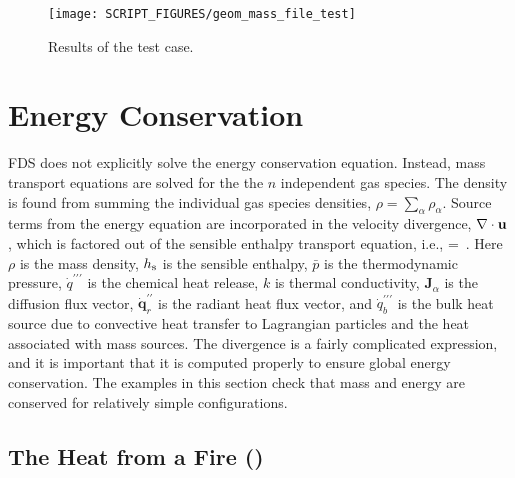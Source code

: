 \documentclass[11pt]{book}
\begin{document}
\begin{figure}[ht]
\centering
\texttt{[image: SCRIPT\_FIGURES/geom\_mass\_file\_test]}
\caption[The  test case]{Results of the  test case.}
\label{fig:geom_mass_file_test}
\end{figure}

\section{Energy Conservation}

FDS does not explicitly solve the energy conservation equation. Instead, mass transport equations are solved for the the $n$ independent gas species.  The density is found from summing the individual gas species densities, $\rho = \sum_\alpha \rho_\alpha$. Source terms from the energy equation are incorporated in the velocity  divergence, $\nabla \cdot {\mathbf{u}}$, which is factored out of the sensible enthalpy transport equation, i.e.,
\be
\label{eqn_new_div}
\nabla\cdot{} =   \,\mbox{.}
\ee
Here $\rho$ is the mass density, $h_{\rm s}$ is the sensible enthalpy, $\bar{p}$ is the thermodynamic pressure, $\dot{q}^{\prime\prime\prime}$ is the chemical heat release, $k$ is thermal conductivity, $\mathbf{J}_\alpha$ is the diffusion flux vector, $\dot{\mathbf{q}}_r^{\prime\prime}$ is the radiant heat flux vector, and $\dot{q}_b^{\prime\prime\prime}$ is the bulk heat source due to convective heat transfer to Lagrangian particles and the heat associated with mass sources. The divergence is a fairly complicated expression, and it is important that it is computed properly to ensure global energy conservation. The examples in this section check that mass and energy are conserved for relatively simple configurations.

\subsection{The Heat from a Fire (\texorpdfstring{}{energy\_budget})}
\label{energy_budget_walls}
\label{energy_budget_adiabatic_walls}
\label{energy_budget_cold_walls}
\end{document}
